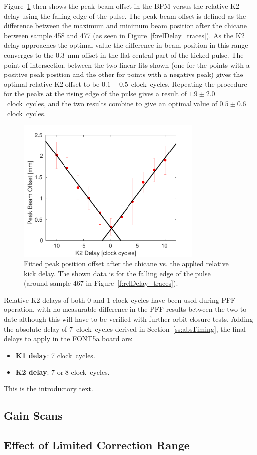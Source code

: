 Figure~\ref{f:relDelay_fit} then shows the peak beam offset in the BPM versus the relative K2 delay using the falling edge of the pulse. The peak beam offset is defined as the difference between the maximum and minimum beam position after the chicane between sample 458 and 477 (as seen in Figure~\ref{f:relDelay_traces}). As the K2 delay approaches the optimal value the difference in beam position in this range converges to the 0.3~mm offset in the flat central part of the kicked pulse. The point of intersection between the two linear fits shown (one for the points with a positive peak position and the other for points with a negative peak) gives the optimal relative K2 offset to be \(0.1\pm0.5\)~clock~cycles. Repeating the procedure for the peaks at the rising edge of the pulse gives a result of \(1.9\pm2.0\)~clock~cycles, and the two results combine to give an optimal value of \(0.5\pm0.6\)~clock~cycles.

\begin{figure}
  \centering
  \includegraphics[width=0.8\textwidth]{Figures/commissioning/relDelay_fit}
  \caption{Fitted peak position offset after the chicane vs. the applied relative kick delay. The shown data is for the falling edge of the pulse (around sample 467 in Figure~\ref{f:relDelay_traces}).}
  \label{f:relDelay_fit}
\end{figure}

Relative K2 delays of both 0 and 1 clock~cycles have been used during PFF operation, with no measurable difference in the PFF results between the two to date although this will have to be verified with further orbit closure tests. Adding the absolute delay of 7~clock~cycles derived in Section~\ref{ss:absTiming}, the final delays to apply in the FONT5a board are:
\begin{itemize}
\item \textbf{K1 delay}: 7 clock~cycles.
\item \textbf{K2 delay}: 7 or 8 clock~cycles.
\end{itemize}


This is the introductory text.

\subsection{Gain Scans}
\label{ss:gainScans}

\subsection{Effect of Limited Correction Range}
\label{ss:effectLimRange}

